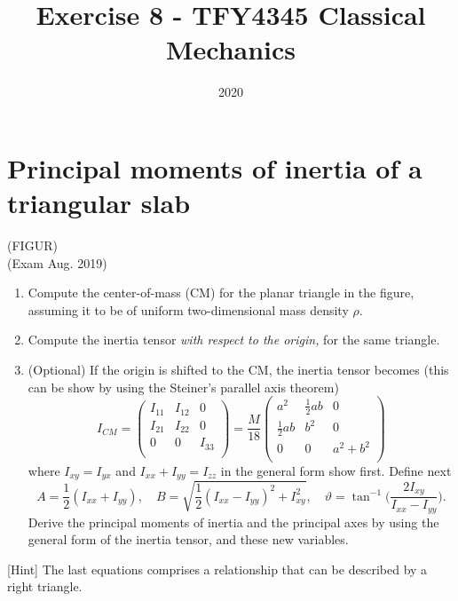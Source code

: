 \documentclass{article}
\title{Exercise 8 - TFY4345 Classical Mechanics}
\date{2020}
\begin{document}
    \maketitle
    \section{Principal moments of inertia of a triangular slab}
    (FIGUR)\\
    (Exam Aug. 2019) \\
    \begin{enumerate}[label=(\alph*)]
        \item Compute the center-of-mass (CM) for the planar triangle in the figure, assuming it to be of uniform two-dimensional mass density $\rho$.
        \item Compute the inertia tensor \emph{with respect to the origin,} for the same triangle.
        \item (Optional) If the origin is shifted to the CM, the inertia tensor becomes (this can be show by using the Steiner's parallel axis theorem)
        \begin{equation*}
            I_{CM} = 
            \begin{pmatrix*}
                I_{11} & I_{12} & 0 \\
                I_{21} & I_{22} & 0 \\
                0 & 0 & I_{33} \\
            \end{pmatrix*}
             =\frac{M}{18} 
            \begin{pmatrix*}
                a^2 & \frac{1}{2}ab & 0 \\
                \frac{1}{2}ab & b^2 & 0 \\
                0 & 0 & a^2 + b^2 \\
            \end{pmatrix*}
        \end{equation*}
        where $I_{xy} = I_{yx}$ and $I_{xx} + I_{yy} = I_{zz}$ in the general form show first. Define next
        \begin{equation*}
            A = \frac{1}{2}(I_{xx} + I_{yy}), \quad B = \sqrt{\frac{1}{2}(I_{xx} - I_{yy})^2 + I_{xy}^2}, \quad \vartheta = \tan^{-1}\bigg( \frac{2I_{xy}}{I_{xx} - I_{yy}}\bigg).
        \end{equation*}
        Derive the principal moments of inertia and the principal axes by using the general form of the inertia tensor, and these new variables.
    \end{enumerate}
    [Hint] The last equations comprises a relationship that can be described by a right triangle.
\end{document}
